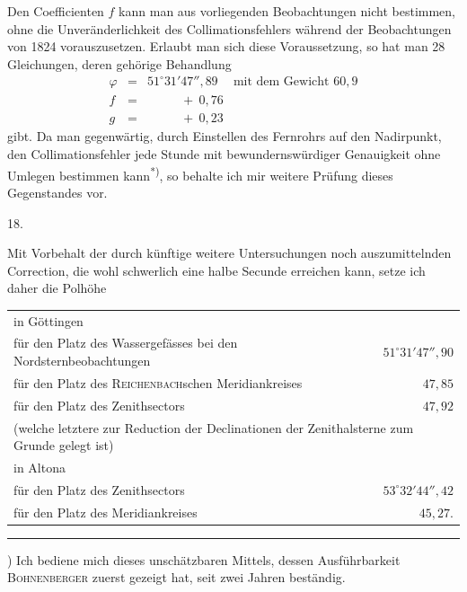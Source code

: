 Den Coefficienten $f$ kann man aus vorliegenden Beobachtungen nicht bestimmen, ohne die Unveränderlichkeit des Collimationsfehlers während der Beobachtungen von 1824 vorauszusetzen. Erlaubt man sich diese Voraussetzung, so hat man 28 Gleichungen, deren gehörige Behandlung
\[
\begin{array}{rcll}
\varphi&=&51^\circ31'47''{,}89&\text{mit dem Gewicht }60{,}9\\
f&=&\phantom{51^\circ31'}+\ 0{,}76&\\
g&=&\phantom{51^\circ31'}+\ 0{,}23&
\end{array}
\]
gibt. Da man gegenwärtig, durch Einstellen des Fernrohrs auf den Nadirpunkt, den Collimationsfehler jede Stunde mit bewundernswürdiger Genauigkeit ohne Umlegen bestimmen kann\textsuperscript{*)}, so behalte ich mir weitere Prüfung dieses Gegenstandes vor.
\begin{center}18.\end{center}
Mit Vorbehalt der durch künftige weitere Untersuchungen noch auszumittelnden Correction, die wohl schwerlich eine halbe Secunde erreichen kann, setze ich daher die Polhöhe
\begin{center}
\begin{tabular}{p{}r}
in Göttingen&\\
\quad für den Platz des Wassergefässes bei den Nordsternbeobachtungen&$51^\circ31'47''{,}90$\\
\quad für den Platz des \textsc{Reichenbach}schen Meridiankreises&$47{,}85$\\
\quad für den Platz des Zenithsectors&$47{,}92$\\
\multicolumn{2}{p{.94\textwidth}}{\quad\quad (welche letztere zur Reduction der Declinationen der Zenithalsterne zum Grunde gelegt ist)}\\
in Altona&\\
\quad für den Platz des Zenithsectors&$53^\circ32'44''{,}42$\\
\quad für den Platz des Meridiankreises&$45{,}27$.
\end{tabular}
\end{center}
\par\noindent\rule{.25\textwidth}{.4pt}\par
{\footnotesize *) Ich bediene mich dieses unschätzbaren Mittels, dessen Ausführbarkeit \textsc{Bohnenberger} zuerst gezeigt hat, seit zwei Jahren beständig.\par}


